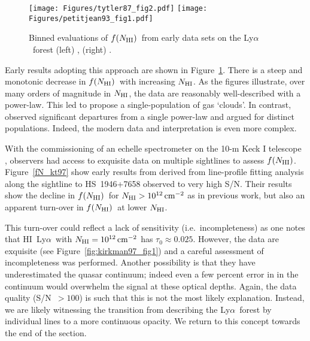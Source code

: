 \documentclass[graybox]{svmult}
\newcommand{\HI}{H{\sc I}}
\def\lya{Ly$\alpha$}
\newcommand{\mnhi}{N_{\rm HI}}
\newcommand{\nhi}{$\mnhi$}
\def\cm#1{\, {\rm cm^{#1}}}
\def\mfnhi{f(\mnhi)}
\def\fnhi{$\mfnhi$}
\begin{document}
%
\begin{figure}[b]
\sidecaption
\texttt{[image: Figures/tytler87\_fig2.pdf]}
\texttt{[image: Figures/petitjean93\_fig1.pdf]}
%
\caption{Binned evaluations of \fnhi\ from early data sets
on the \lya\ forest (left) \cite{tytler87}, (right) \cite{petit93}.
}
\label{fig:binfN}       %
\end{figure}

Early results adopting this approach are shown in 
Figure~\ref{fig:binfN}.  There is a steep and monotonic
decrease in \fnhi\ with increasing \nhi.  As the figures
illustrate, over many orders of magnitude in \nhi, the
data are reasonably  well-described with a power-law.
This led \cite{tytler87}
to propose a single-population of gas `clouds'.
In contrast, \cite{petit93} observed significant
departures from a single power-law and 
argued for distinct populations. Indeed, the
modern data and interpretation is even more complex.

With the commissioning of an echelle spectrometer on
the 10-m Keck I telescope \cite[HIRES]{vogt94}, 
observers had access to exquisite data on multiple 
sightlines to assess \fnhi.  Figure~\ref{fN_kt97}
show early results from \cite{kt97} derived from
line-profile fitting analysis along the sightline
to HS~1946+7658 observed to very high S/N.  
Their results show the decline in \fnhi\ for
$\mnhi > 10^{12} \cm{-2}$ as in previous work, but 
also an apparent turn-over in \fnhi\ at lower \nhi. 

This turn-over could reflect a lack of sensitivity 
(i.e.\ incompleteness) as one notes that \HI\ \lya\
with  $\mnhi = 10^{12} \cm{-2}$ has $\tau_0 \approx 0.025$.
However, the data are exquisite (see Figure~\ref{fig:kirkman97_fig1})
and a careful assessment of incompleteness was performed.
Another possibility is that they have underestimated the
quasar continuum; indeed even a few percent error in
in the continuum would overwhelm the signal at these
optical depths.  Again, the data quality (S/N~$>100$)
is such that this is not the most likely explanation.
Instead, we are likely witnessing the transition from
describing the \lya\ forest by individual lines to 
a more continuous opacity.  We return to this concept
towards the end of the section.
\end{document}

